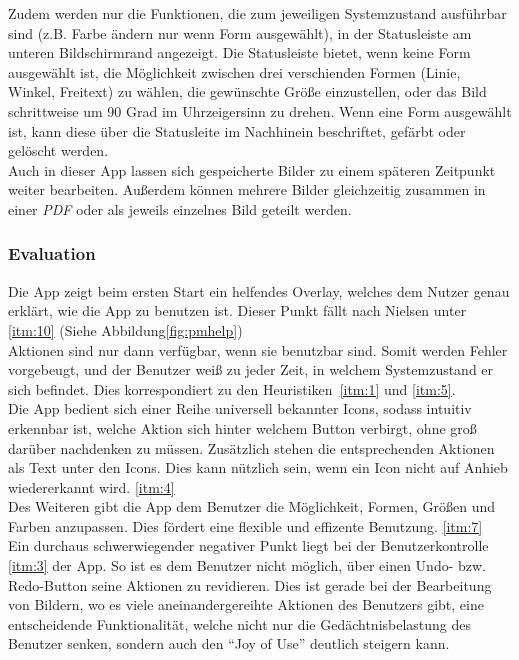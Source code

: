 Zudem werden nur die Funktionen, die zum jeweiligen Systemzustand ausführbar sind (z.B. Farbe ändern nur wenn Form ausgewählt), in der Statusleiste am unteren Bildschirmrand angezeigt.
Die Statusleiste bietet, wenn keine Form ausgewählt ist, die Möglichkeit zwischen drei verschienden Formen (Linie, Winkel, Freitext) zu wählen, die gewünschte Größe einzustellen, oder das Bild schrittweise um 90 Grad im Uhrzeigersinn zu drehen.
Wenn eine Form ausgewählt ist, kann diese über die Statusleite im Nachhinein beschriftet, gefärbt oder gelöscht werden. \\

Auch in dieser App lassen sich gespeicherte Bilder zu einem späteren Zeitpunkt weiter bearbeiten.
Außerdem können mehrere Bilder gleichzeitig zusammen in einer \emph{PDF} oder als jeweils einzelnes Bild geteilt werden.

\subsubsection{Evaluation}
Die App zeigt beim ersten Start ein helfendes Overlay, welches dem Nutzer genau erklärt, wie die App zu benutzen ist. Dieser Punkt fällt nach Nielsen unter \ref{itm:10} (Siehe Abbildung\ref{fig:pmhelp}) \\
 
Aktionen sind nur dann verfügbar, wenn sie benutzbar sind. Somit werden Fehler vorgebeugt, und der Benutzer weiß zu jeder Zeit, in welchem Systemzustand er sich befindet. Dies korrespondiert zu den Heuristiken~\ref{itm:1} und \ref{itm:5}.  \\

Die App bedient sich einer Reihe universell bekannter Icons, sodass intuitiv erkennbar ist, welche Aktion sich hinter welchem Button verbirgt, ohne groß darüber nachdenken zu müssen. Zusätzlich stehen die entsprechenden Aktionen als Text unter den Icons. Dies kann nützlich sein, wenn ein Icon nicht auf Anhieb wiedererkannt wird. \ref{itm:4}  \\

Des Weiteren gibt die App dem Benutzer die Möglichkeit, Formen, Größen und Farben anzupassen. Dies fördert eine flexible und effizente Benutzung. \ref{itm:7} \\

Ein durchaus schwerwiegender negativer Punkt liegt bei der Benutzerkontrolle \ref{itm:3} der App. So ist es dem Benutzer nicht möglich, über einen Undo- bzw. Redo-Button seine Aktionen zu revidieren. Dies ist gerade bei der Bearbeitung von Bildern, wo es viele aneinandergereihte Aktionen des Benutzers gibt, eine entscheidende Funktionalität, welche nicht nur die Gedächtnisbelastung des Benutzer senken, sondern auch den ``Joy of Use'' deutlich steigern kann. \\

